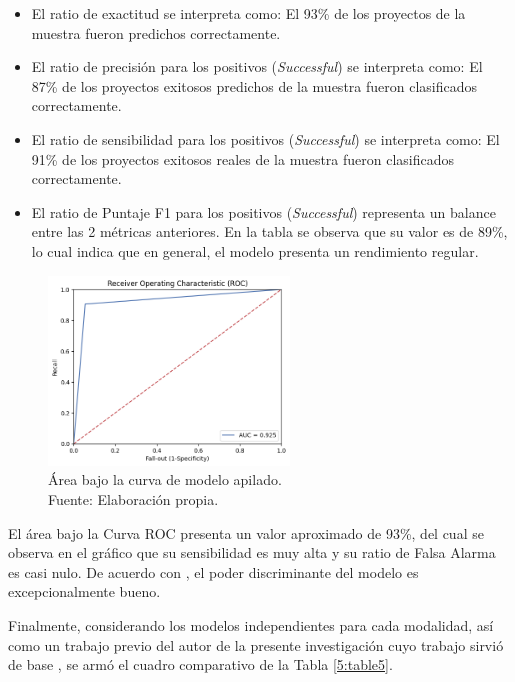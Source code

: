 \begin{itemize}
	\item El ratio de exactitud se interpreta como: El 93\% de los proyectos de la muestra fueron predichos correctamente.
	\item El ratio de precisión para los positivos (\textit{Successful}) se interpreta como: El 87\% de los proyectos exitosos predichos de la muestra fueron clasificados correctamente. 
	\item El ratio de sensibilidad para los positivos (\textit{Successful}) se interpreta como: El 91\% de los proyectos exitosos reales de la muestra fueron clasificados correctamente.
	\item El ratio de Puntaje F1 para los positivos (\textit{Successful}) representa un balance entre las 2 métricas anteriores. En la tabla se observa que su valor es de 89\%, lo cual indica que en general, el modelo presenta un rendimiento regular.
\end{itemize}

\begin{figure}[!ht]
	\begin{center}
		\includegraphics[width=0.57\textwidth]{5/figures/stacked_auc.png}
		\caption[Área bajo la curva de modelo apilado]{Área bajo la curva de modelo apilado.\\
		Fuente: Elaboración propia.}
		\label{5:fig12}
	\end{center}
\end{figure}

El área bajo la Curva ROC presenta un valor aproximado de 93\%, del cual se observa en el gráfico que su sensibilidad es muy alta y su ratio de Falsa Alarma es casi nulo. De acuerdo con \cite{bk_britos2006datamining}, el poder discriminante del modelo es excepcionalmente bueno.

Finalmente, considerando los modelos independientes para cada modalidad, así como un trabajo previo del autor de la presente investigación cuyo trabajo sirvió de base \parencite{pr_puente2019kickstarter_prediction}, se armó el cuadro comparativo de la Tabla \ref{5:table5}.

